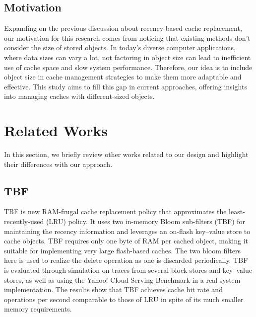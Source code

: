 \documentclass[journal,10.5pt,onecolumn]{IEEEtran}
\begin{document}
\subsection{Motivation}
Expanding on the previous discussion about recency-based cache replacement, our motivation for this research comes from noticing that existing methods don't consider the size of stored objects. In today's diverse computer applications, where data sizes can vary a lot, not factoring in object size can lead to inefficient use of cache space and slow system performance. Therefore, our idea is to include object size in cache management strategies to make them more adaptable and effective. This study aims to fill this gap in current approaches, offering insights into managing caches with different-sized objects.


\section{Related Works}
In this section, we briefly review other works related to our design and highlight their differences with our approach.

\subsection{TBF}
TBF \cite{b2} is new RAM-frugal cache replacement policy that approximates the least-recently-used (LRU) policy. It uses two in-memory Bloom sub-filters (TBF) for maintaining the recency information and leverages an on-flash key–value store to cache objects. TBF requires only one byte of RAM per cached object, making it suitable for implementing very large flash-based caches. The two bloom filters here is used to realize the delete operation as one is discarded periodically. TBF is evaluated through simulation on traces from several block stores and key–value stores, as well as using the Yahoo! Cloud Serving Benchmark in a real system implementation. The results show that TBF achieves cache hit rate and operations per second comparable to those of LRU in spite of its much smaller memory requirements.
\end{document}
